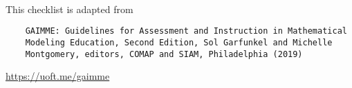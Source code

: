\begin{siam2019}
\begin{definition}
\hfill \\

This checklist is adapted from

\begin{graybox}
\begin{minipage}{.75\textwidth}
\begin{verbatim}
	GAIMME: Guidelines for Assessment and Instruction in Mathematical
	Modeling Education, Second Edition, Sol Garfunkel and Michelle
	Montgomery, editors, COMAP and SIAM, Philadelphia (2019)
\end{verbatim}
\begin{center}
\url{https://uoft.me/gaimme}
\end{center}
\end{minipage}
\hfill
\begin{minipage}{.20\textwidth}
	\hfill{}	
\end{minipage}
\end{graybox}

\end{definition}

	
\end{siam2019}




